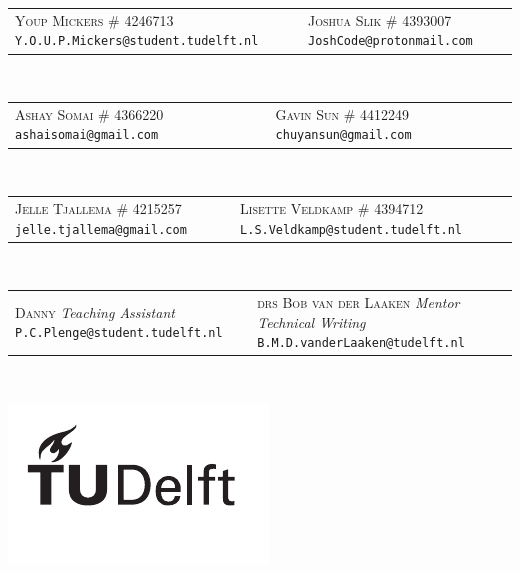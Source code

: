 \begin{titlepage}
\begin{center}
		\begin{tabular}{C{7cm} C{7cm}}
			\textsc{Youp Mickers} \newline
				\textsc{\# 4246713} \newline
				\texttt{Y.O.U.P.Mickers@student.tudelft.nl}	&
			\textsc{Joshua Slik} \newline
				\textsc{\# 4393007} \newline
				\texttt{JoshCode@protonmail.com}
		\end{tabular}
		\\[2mm]
		\begin{tabular}{C{7cm} C{7cm}}
			\textsc{Ashay Somai} \newline
				\textsc{\# 4366220} \newline
				\texttt{ashaisomai@gmail.com} &
			\textsc{Gavin Sun} \newline
				\textsc{\# 4412249} \newline
				\texttt{chuyansun@gmail.com}
		\end{tabular}
		\\[2mm]
		\begin{tabular}{C{7cm} C{7cm}}
			\textsc{Jelle Tjallema} \newline
				\textsc{\# 4215257} \newline
				\texttt{jelle.tjallema@gmail.com}	&
			\textsc{Lisette Veldkamp} \newline
				\textsc{\# 4394712} \newline
				\texttt{L.S.Veldkamp@student.tudelft.nl}
		\end{tabular}
		\\[8mm]
		\begin{tabular}{C{7cm} C{7cm}}
			\textsc{Danny} \newline
				\textsl{Teaching Assistant} \newline
				\texttt{P.C.Plenge@student.tudelft.nl} &
			\textsc{drs Bob van der Laaken} \newline
				\textsl{Mentor Technical Writing} \newline
				\texttt{B.M.D.vanderLaaken@tudelft.nl}
		\end{tabular}
		\\[2mm]
	\end{center}
	\vfill
	\includegraphics{./contents/graphics/TU_Deflt_Logo_Black.pdf}
\end{titlepage}